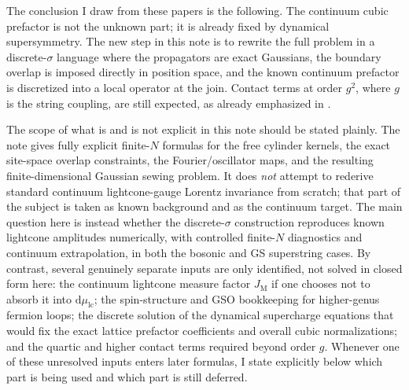 \documentclass[11pt]{article}
\numberwithin{equation}{section}
\newcommand{\dd}{\mathrm{d}}
\begin{document}
The conclusion I draw from these papers is the following. The continuum cubic prefactor is not the unknown part; it is already fixed by dynamical supersymmetry. The new step in this note is to rewrite the full problem in a discrete-$\sigma$ language where the propagators are exact Gaussians, the boundary overlap is imposed directly in position space, and the known continuum prefactor is discretized into a local operator at the join. Contact terms at order $g^2$, where $g$ is the string coupling, are still expected, as already emphasized in \cite{GreenSeiberg1988,GreensiteKlinkhamer1988}.

The scope of what is and is not explicit in this note should be stated plainly. The note gives fully explicit finite-$N$ formulas for the free cylinder kernels, the exact site-space overlap constraints, the Fourier/oscillator maps, and the resulting finite-dimensional Gaussian sewing problem. It does \emph{not} attempt to rederive standard continuum lightcone-gauge Lorentz invariance from scratch; that part of the subject is taken as known background and as the continuum target. The main question here is instead whether the discrete-$\sigma$ construction reproduces known lightcone amplitudes numerically, with controlled finite-$N$ diagnostics and continuum extrapolation, in both the bosonic and GS superstring cases. By contrast, several genuinely separate inputs are only identified, not solved in closed form here: the continuum lightcone measure factor $J_{\mathrm{M}}$ if one chooses not to absorb it into $\dd\mu_{\mathrm{lc}}$; the spin-structure and GSO bookkeeping for higher-genus fermion loops; the discrete solution of the dynamical supercharge equations that would fix the exact lattice prefactor coefficients and overall cubic normalizations; and the quartic and higher contact terms required beyond order $g$. Whenever one of these unresolved inputs enters later formulas, I state explicitly below which part is being used and which part is still deferred.
\end{document}
